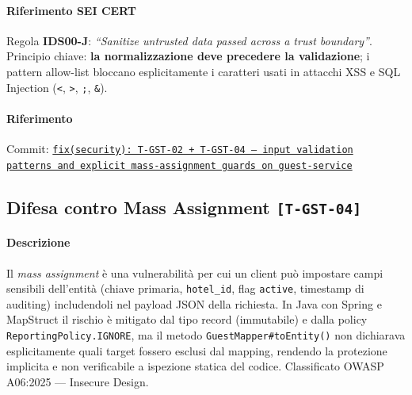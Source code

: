 ﻿\documentclass[a4paper,12pt]{report}
\newcommand{\commitref}[2]{\texttt{\small \href{https://github.com/diegoandruccioli/hotel-pms/commit/#1}{#2}}}
\newcommand{\threat}[1]{\texttt{\small\textcolor{vulnred}{[#1]}}}
\begin{document}
\paragraph{Riferimento SEI CERT} Regola \textbf{IDS00-J}: \emph{``Sanitize untrusted data passed across a trust boundary''}. Principio chiave: \textbf{la normalizzazione deve precedere la validazione}; i pattern allow-list bloccano esplicitamente i caratteri usati in attacchi XSS e SQL Injection (\texttt{<}, \texttt{>}, \texttt{;}, \texttt{\&}).

\paragraph{Riferimento} Commit: \commitref{fb6fdff}{fix(security): T-GST-02 + T-GST-04 --- input validation \\
patterns and explicit mass-assignment guards on guest-service}

\subsection{Difesa contro Mass Assignment \threat{T-GST-04}}

\paragraph{Descrizione}
Il \emph{mass assignment} è una vulnerabilità per cui un client può impostare
campi sensibili dell'entità (chiave primaria, \texttt{hotel\_id}, flag
\texttt{active}, timestamp di auditing) includendoli nel payload JSON della
richiesta. In Java con Spring e MapStruct il rischio è mitigato dal tipo record
(immutabile) e dalla policy \texttt{ReportingPolicy.IGNORE}, ma il metodo
\texttt{GuestMapper\#toEntity()} non dichiarava esplicitamente quali target
fossero esclusi dal mapping, rendendo la protezione implicita e non verificabile
a ispezione statica del codice. Classificato OWASP A06:2025 --- Insecure Design.
\end{document}
